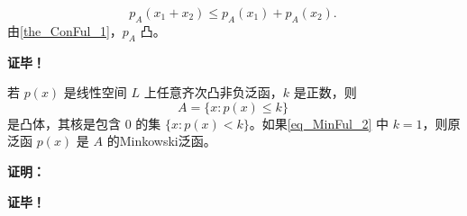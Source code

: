  \begin{equation}
p_A(x_1+x_2)\leq p_A(x_1)+p_A(x_2).~
 \end{equation}
 由\autoref{the_ConFul_1}，$p_A$ 凸。








\textbf{证毕！}

\begin{theorem}{}
若 $p(x)$ 是线性空间 $L$ 上任意齐次凸非负泛函，$k$ 是正数，则
\begin{equation}\label{eq_MinFul_2}
A=\{x:p(x)\leq k\}~
\end{equation}
是凸体，其核是包含 $0$ 的集 $\{x:p(x)<k\}$。如果\autoref{eq_MinFul_2} 中 $k=1$，则原泛函 $p(x)$ 是 $A$ 的Minkowski泛函。
\end{theorem}

\textbf{证明：}




\textbf{证毕！}
